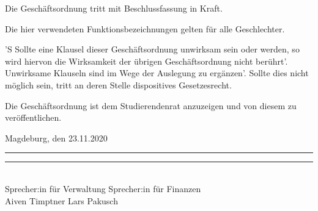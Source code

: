 \documentclass[%
    parskip=half,
]{scrartcl}
\begin{document}
\begin{contract}

Die Geschäftsordnung tritt mit Beschlussfassung in Kraft.

Die hier verwendeten Funktionsbezeichnungen gelten für alle Geschlechter.

'S Sollte eine Klausel dieser Geschäftsordnung unwirksam sein oder werden, so wird hiervon die Wirksamkeit der übrigen Geschäftsordnung nicht berührt'.
Unwirksame Klauseln sind im Wege der Auslegung zu ergänzen'.
Sollte dies nicht möglich sein, tritt an deren Stelle dispositives Gesetzesrecht.

Die Geschäftsordnung ist dem Studierendenrat anzuzeigen und von diesem zu veröffentlichen.

\end{contract}

\vspace{1cm}

Magdeburg, den 23.11.2020

\vspace{1cm}

\rule{5cm}{.3pt} \hfill \rule{5cm}{.3pt} \\
Sprecher:in für Verwaltung \hfill Sprecher:in für Finanzen \\
Aiven Timptner \hfill Lars Pakusch \\
\end{document}
